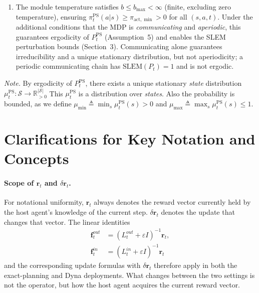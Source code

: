 \documentclass[10pt,a4paper]{article}
\begin{document}
\begin{enumerate}
\[    \qquad A_t(s,a) = \gamma\!\textstyle\sum_{s'} p(s'|s,a)\,V_t(s') - \max_{a'}\gamma\!\textstyle\sum_{s'} p(s'|s,a')\,V_t(s').
  \]
  Here $A_t(s,a) \leq 0$ and the best action at state $s$ has zero logit, providing a numerically stable state-centered softmax.  $\pi^{\mathrm{PS}}_t$ is used solely to construct the topology-induced priority operator $\mathbf{f}^{out}_t$, $\mathbf{f}^{in}_t$.
  After each Bellman backup at state $s$ that changes $V(s)$ by $\Delta V$, the GTA-PS module recomputes $\pi^{\mathrm{PS}}(\cdot|s)$ from the updated advantages $A_{t+1}(s,\cdot)$.
  \item The module temperature satisfies $b \leq b_{\max} < \infty$ (finite, excluding zero temperature), ensuring $\pi^{\mathrm{PS}}_t(a|s) \geq \pi_{\mathrm{act},\min} > 0$ for all $(s,a,t)$. Under the additional conditions that the MDP is \emph{communicating} and \emph{aperiodic}, this guarantees ergodicity of $P^{\mathrm{PS}}_t$ (Assumption~5) and enables the SLEM perturbation bounds (Section~3). Communicating alone guarantees irreducibility and a unique stationary distribution, but not aperiodicity; a periodic communicating chain has $\mathrm{SLEM}(P_t) = 1$ and is not ergodic.
\end{enumerate}

\textit{Note.} By ergodicity of $P_t^{\mathrm{PS}}$, there exists a unique stationary \emph{state} distribution
$ \mu_t^{\mathrm{PS}}: \mathcal{S} \rightarrow \mathbb{R}^{|\mathcal{S}|}_{>0}$
This $\mu_t^{\mathrm{PS}}$ is a distribution over \emph{states}.
Also the probability is bounded, as we define
$\mu_{\min} \triangleq \min_s \mu_t^{\mathrm{PS}}(s) > 0$ and
$\mu_{\max} \triangleq \max_s \mu_t^{\mathrm{PS}}(s) \leq 1$.




\section{Clarifications for Key Notation and Concepts}

\paragraph{Scope of $\mathbf{r}_t$ and $\delta\mathbf{r}_t$.}
For notational uniformity, $\mathbf{r}_t$ always denotes the reward vector currently held by the host agent's knowledge of the current step.
$\delta\mathbf{r}_t$ denotes the update that changes that vector.  The linear identities
\[
\begin{aligned}
  \mathbf{f}^{out}_t &= (L^{out}_t+\varepsilon I)^{-1}\mathbf{r}_t, \\
  \mathbf{f}^{in}_t  &= (L^{in}_t+\varepsilon I)^{-1}\mathbf{r}_t
\end{aligned}
\]
and the corresponding update formulas with $\delta\mathbf{r}_t$ therefore apply in both the exact-planning and Dyna deployments.
What changes between the two settings is not the operator, but how the host agent acquires the current reward vector.
\end{document}
